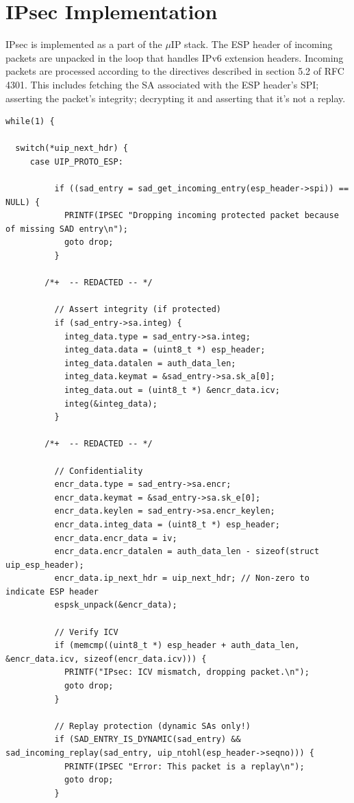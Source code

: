 \documentclass[final,a4paper,twoside,11pt,onecolumn]{report}
\begin{document}

\section{IPsec Implementation}
IPsec is implemented as a part of the $\mu$IP stack. The ESP header of incoming packets are unpacked in the loop that handles IPv6 extension headers. Incoming packets are processed according to the directives described in section 5.2 of RFC 4301. This includes fetching the SA associated with the ESP header's SPI; asserting the packet's integrity; decrypting it and asserting that it's not a replay.

\lstset{language=c}
\begin{lstlisting}
while(1) {
 
  switch(*uip_next_hdr) {
     case UIP_PROTO_ESP:

    	  if ((sad_entry = sad_get_incoming_entry(esp_header->spi)) == NULL) {
    	    PRINTF(IPSEC "Dropping incoming protected packet because of missing SAD entry\n");
    	    goto drop;
    	  }

        /*+  -- REDACTED -- */

    	  // Assert integrity (if protected)
    	  if (sad_entry->sa.integ) {
    	    integ_data.type = sad_entry->sa.integ;
    	    integ_data.data = (uint8_t *) esp_header;
    	    integ_data.datalen = auth_data_len;
    	    integ_data.keymat = &sad_entry->sa.sk_a[0];
    	    integ_data.out = (uint8_t *) &encr_data.icv;          
    	    integ(&integ_data);
    	  }
    	
        /*+  -- REDACTED -- */

    	  // Confidentiality      	  
    	  encr_data.type = sad_entry->sa.encr;
    	  encr_data.keymat = &sad_entry->sa.sk_e[0];
    	  encr_data.keylen = sad_entry->sa.encr_keylen;
    	  encr_data.integ_data = (uint8_t *) esp_header;
    	  encr_data.encr_data = iv;
    	  encr_data.encr_datalen = auth_data_len - sizeof(struct uip_esp_header);
    	  encr_data.ip_next_hdr = uip_next_hdr; // Non-zero to indicate ESP header
    	  espsk_unpack(&encr_data);
    	  
    	  // Verify ICV
    	  if (memcmp((uint8_t *) esp_header + auth_data_len, &encr_data.icv, sizeof(encr_data.icv))) {
    	    PRINTF("IPsec: ICV mismatch, dropping packet.\n");
    	    goto drop;
    	  }
    	
    	  // Replay protection (dynamic SAs only!)
    	  if (SAD_ENTRY_IS_DYNAMIC(sad_entry) && sad_incoming_replay(sad_entry, uip_ntohl(esp_header->seqno))) {          
    	    PRINTF(IPSEC "Error: This packet is a replay\n");
    	    goto drop;
    	  }
\end{lstlisting}
\end{document}
